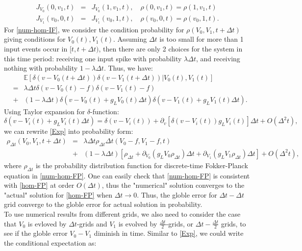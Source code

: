 \documentclass[10pt]{article}
\begin{document}
\begin{multicols}{2}
  \begin{eqnarray}
J_{V_0}(0,v_1,t) &=& J_{V_0}(1,v_1,t), \quad \rho(0,v_1,t) =  \rho(1,v_1,t) \nonumber\\
\label{B.C.}
J_{V_1}(v_0,0,t) &=& J_{V_1}(v_0,1,t), \quad \rho(v_0,0,t) =  \rho(v_0,1,t).
  \end{eqnarray}
\indent
For \ref{num-hom-IF}, we consider the condition probability for $\rho(V_0,V_1,t+\Delta t)$ giving conditions for $V_0(t),V_1(t)$. Assuming $\Delta t$ is too small for more than 1 input events occur in $[t,t+\Delta t)$, then there are only 2 choices for the system in this time period: receiving one input spike with probability $\lambda\Delta t$, and receiving nothing with probability $1-\lambda\Delta t$. Thus, we have:
  \begin{eqnarray}
&&\mathbb{E}[\delta(v-V_0(t+\Delta t))\delta(v-V_1(t+\Delta t))|V_0(t),V_1(t)] \nonumber\\
 &=& \lambda\Delta t \delta(v-V_0(t)-f)\delta(v-V_1(t)-f) \nonumber\\
\label{Exp}
&+&(1-\lambda\Delta t) \delta(v-V_0(t)+g_LV_0(t)\Delta t)\delta(v-V_1(t)+g_LV_1(t)\Delta t).
\end{eqnarray}
Using Taylor expansion for $\delta$-function:
$$
\delta(v-V_i(t)+g_LV_i(t)\Delta t) = \delta(v-V_i(t))+\partial_v[\delta(v-V_i(t))g_LV_i(t)]\Delta t + O(\Delta^2 t),
$$
we can rewrite \ref{Exp} into probability form:
\begin{eqnarray}
\label{num-hom-FP}
\rho_{\Delta t}(V_0,V_1,t+\Delta t) &=& \lambda\Delta t\rho_{\Delta t}\Delta t(V_0-f,V_1-f,t) \nonumber\\
&+& (1-\lambda\Delta t)[\rho_{\Delta t}+\partial_{V_0}(g_LV_0\rho_{\Delta t})\Delta t+\partial_{V_1}(g_LV_1\rho_{\Delta t})\Delta t]+O(\Delta^2 t),  
\end{eqnarray}
where $\rho_{\Delta t}$ is the probability distribution function for discrete-time Fokker-Planck equation in \ref{num-hom-FP}. One can easily check that \ref{num-hom-FP} is consistent with \ref{hom-FP} at order $O(\Delta t)$, thus the "numerical" solution converges to the "actual" solution for  \ref{hom-FP} when $\Delta t \rightarrow 0$. Thus, the globle error for $\Delta t-\Delta t$ grid converge to the globle error for actual solution in probability.\\
\indent
To use numerical results from different grids, we also need to consider the case that $V_0$ is evloved by $\Delta t$-grids and $V_1$ is evolved by $\frac{\Delta t}{2}$-grids, or $\Delta t-\frac{\Delta t}{2}$ grids, to see if the globle error $V_0-V_1$ diminish in time. Similar to \ref{Exp}, we could write the conditional expectation as:

\end{multicols}
\end{document}
